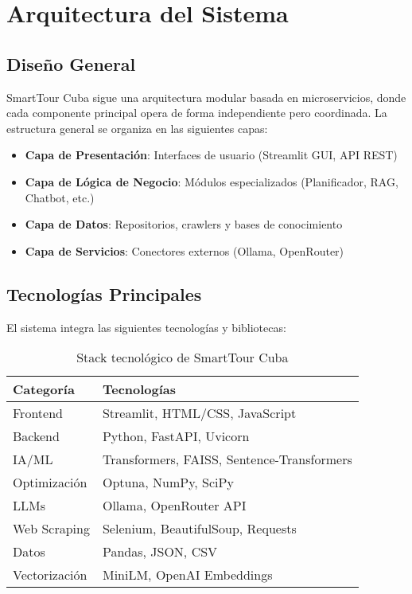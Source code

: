 \documentclass[runningheads]{llncs}
\begin{document}
\section{Arquitectura del Sistema}

\subsection{Diseño General}

SmartTour Cuba sigue una arquitectura modular basada en microservicios, donde cada componente principal opera de forma independiente pero coordinada. La estructura general se organiza en las siguientes capas:

\begin{itemize}
\item \textbf{Capa de Presentación}: Interfaces de usuario (Streamlit GUI, API REST)
\item \textbf{Capa de Lógica de Negocio}: Módulos especializados (Planificador, RAG, Chatbot, etc.)
\item \textbf{Capa de Datos}: Repositorios, crawlers y bases de conocimiento
\item \textbf{Capa de Servicios}: Conectores externos (Ollama, OpenRouter)
\end{itemize}

\subsection{Tecnologías Principales}

El sistema integra las siguientes tecnologías y bibliotecas:

\begin{table}[H]
\centering
\begin{tabular}{ll}
\toprule
\textbf{Categoría} & \textbf{Tecnologías} \\
\midrule
Frontend & Streamlit, HTML/CSS, JavaScript \\
Backend & Python, FastAPI, Uvicorn \\
IA/ML & Transformers, FAISS, Sentence-Transformers \\
Optimización & Optuna, NumPy, SciPy \\
LLMs & Ollama, OpenRouter API \\
Web Scraping & Selenium, BeautifulSoup, Requests \\
Datos & Pandas, JSON, CSV \\
Vectorización & MiniLM, OpenAI Embeddings \\
\bottomrule
\end{tabular}
\caption{Stack tecnológico de SmartTour Cuba}
\end{table}
\end{document}
